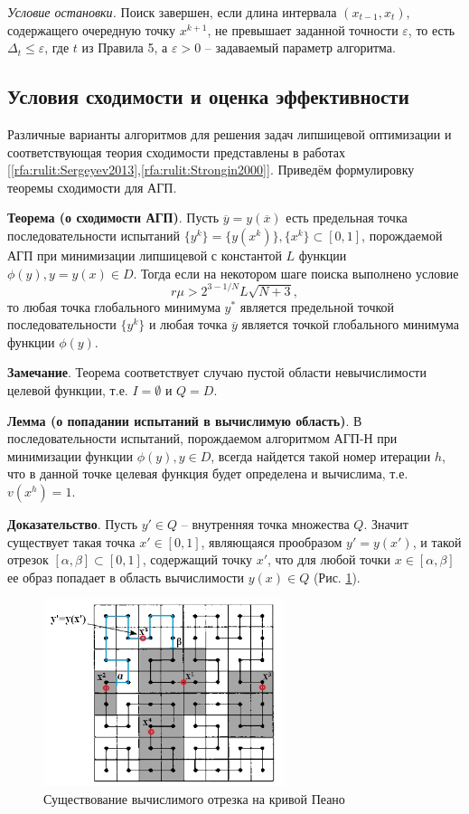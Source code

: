 \documentclass[10pt,a4paper]{book}
\begin{document}
\textit{Условие остановки.} Поиск завершен, если длина интервала $(x_{t-1},x_t)$, содержащего очередную точку $x^{k+1}$, не превышает заданной точности $\varepsilon$, то есть $\Delta _t \leq \varepsilon$, где $t$ из Правила 5, а $\varepsilon>0$ -- задаваемый параметр алгоритма.

\subsection{Условия сходимости и оценка эффективности}

Различные варианты алгоритмов для решения задач липшицевой оптимизации и соответствующая теория сходимости представлены в работах [\ref{rfa:rulit:Sergeyev2013},\ref{rfa:rulit:Strongin2000}]. Приведём формулировку теоремы сходимости для АГП.

\textbf{Теорема (о сходимости АГП)}. Пусть $\overline{y}=y(\overline{x})$ есть предельная точка последовательности испытаний $\{y^k\}=\{y(x^k)\}, \{x^k\} \subset [0,1]$, порождаемой АГП при минимизации липшицевой с константой $L$ функции $\phi(y), y = y(x) \in D$. Тогда если на некотором шаге поиска выполнено условие 
\[
r\mu > 2^{3-1/N}L\sqrt{N+3},
\]
то любая точка глобального минимума $y^*$ является предельной точкой последовательности $\{y^k\}$ и любая точка $\overline{y}$ является точкой глобального минимума функции $\phi(y)$.

\textbf{Замечание}. Теорема соответствует случаю пустой области невычислимости целевой функции, т.е. $I = \emptyset$ и $Q = D$.

\textbf{Лемма (о попадании испытаний в вычислимую область)}. В последовательности испытаний, порождаемом алгоритмом АГП-Н при минимизации функции $\phi(y), y \in D$, всегда найдется такой номер итерации $h$, что в данной точке целевая функция будет определена и вычислима, т.е. $v(x^h) = 1$.

\textbf{Доказательство}. Пусть $y' \in Q$ -- внутренняя точка множества $Q$. Значит существует такая точка $x' \in [0,1]$, являющаяся прообразом $y' = y(x')$, и такой отрезок $[\alpha, \beta] \subset [0, 1]$, содержащий точку $x'$, что для любой точки $x \in [\alpha, \beta]$ ее образ попадает в область вычислимости $y(x) \in Q$ (Рис. \ref{fig_1}). 

\begin{figure}[h]
\includegraphics[width=200pt]{pic/fig_1.jpg}
\caption{Существование вычислимого отрезка на кривой Пеано} \label{fig_1}
\end{figure}
\end{document}
